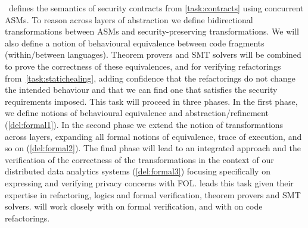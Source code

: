 \begin{Workpackage}{\thewpno}
\begin{Task}
\theTask\ defines the semantics of security contracts from \ref{task:contracts} using concurrent ASMs. To reason across layers of abstraction we define %
 bidirectional transformations between ASMs %
and security-preserving transformations. We will also define a notion of behavioural equivalence between code fragments (within/between languages). Theorem provers and SMT solvers will be combined to prove the correctness of these equivalences, and for verifying refactorings
from~\ref{task:statichealing}, adding confidence that the refactorings do not change the intended behaviour and 
\taskbreak 
that we can find one that satisfies the security requirements imposed. 
This task will proceed in three phases. In the first phase, we define notions of behavioural equivalence and abstraction/refinement 
(\ref{del:formal1}). In the second phase we extend the notion of transformations across layers, expanding all formal notions of equivalence, trace of execution, and so on
(\ref{del:formal2}). The final phase will lead to an integrated approach and the verification of the correctness of the transformations in the context of our distributed data analytics systems (\ref{del:formal3}) focusing specifically on expressing and verifying privacy concerns with FOL.
\SA leads this task given their expertise in refactoring, logics and formal verification, theorem provers and SMT solvers. 
\SA will work closely with \SCCHshort on formal verification, and with \UCM on code refactorings.

\end{Task}


\end{Workpackage}
